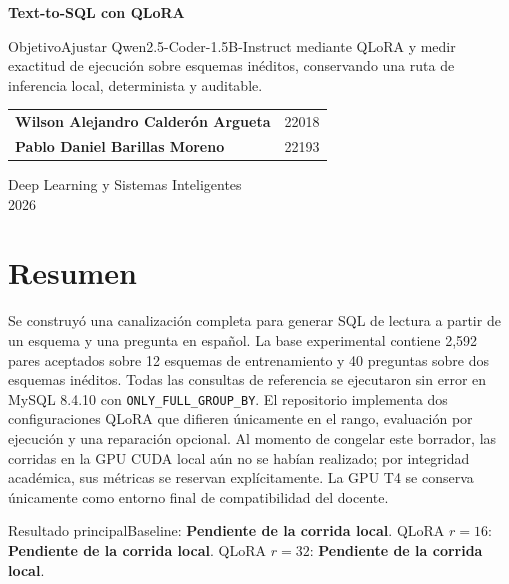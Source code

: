 \documentclass[10pt,letterpaper]{article}
\newcommand{\pendiente}{\textcolor{rust}{\textbf{Pendiente de la corrida local}}}
\newcommand{\code}[1]{\texttt{#1}}
\begin{document}
\begin{titlepage}\color{ink}\vspace*{1cm}
\par\vspace{.25cm}\noindent{\color{teal}\rule{\textwidth}{2pt}\par}\vspace{1.5cm}
{\Huge\bfseries Text-to-SQL con QLoRA\par}\vspace{.35cm}{\Large Traducción reproducible de preguntas en español a MySQL\par}\vspace{1.2cm}
\begin{resultado}{Objetivo}Ajustar Qwen2.5-Coder-1.5B-Instruct mediante QLoRA y medir exactitud de ejecución sobre esquemas inéditos, conservando una ruta de inferencia local, determinista y auditable.\end{resultado}
\vfill
\begin{tabular}{@{}ll@{}}\textbf{Wilson Alejandro Calderón Argueta}&22018\\\textbf{Pablo Daniel Barillas Moreno}&22193\end{tabular}\vspace{.8cm}

Deep Learning y Sistemas Inteligentes\\2026
\end{titlepage}
\tableofcontents\clearpage

\section{Resumen}
Se construyó una canalización completa para generar SQL de lectura a partir de un esquema y una pregunta en español. La base experimental contiene 2,592 pares aceptados sobre 12 esquemas de entrenamiento y 40 preguntas sobre dos esquemas inéditos. Todas las consultas de referencia se ejecutaron sin error en MySQL 8.4.10 con \code{ONLY\_FULL\_GROUP\_BY}. El repositorio implementa dos configuraciones QLoRA que difieren únicamente en el rango, evaluación por ejecución y una reparación opcional. Al momento de congelar este borrador, las corridas en la GPU CUDA local aún no se habían realizado; por integridad académica, sus métricas se reservan explícitamente. La GPU T4 se conserva únicamente como entorno final de compatibilidad del docente.
\begin{resultado}{Resultado principal}Baseline: \pendiente. QLoRA $r=16$: \pendiente. QLoRA $r=32$: \pendiente.\end{resultado}
\end{document}
